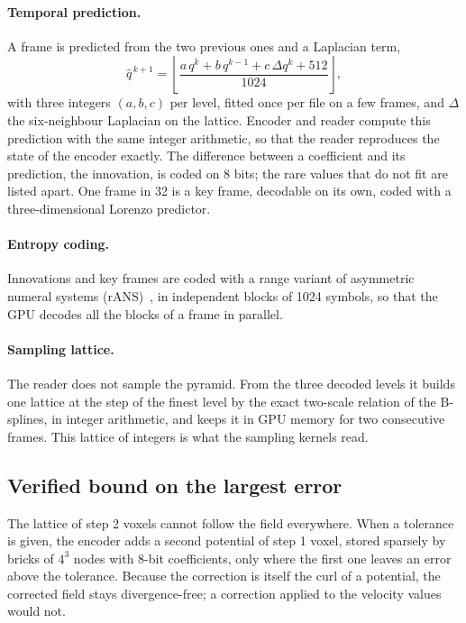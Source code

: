 \documentclass[11pt,a4paper]{article}
\begin{document}
\paragraph{Temporal prediction.}
A frame is predicted from the two previous ones and a Laplacian term,
\begin{equation}
  \hat{q}^{\,k+1} = \left\lfloor \frac{a\,q^{k} + b\,q^{k-1} + c\,\Delta q^{k} + 512}{1024} \right\rfloor ,
\end{equation}
with three integers $(a, b, c)$ per level, fitted once per file on a few frames, and $\Delta$ the six-neighbour
Laplacian on the lattice. Encoder and reader compute this prediction with the same integer arithmetic, so that the
reader reproduces the state of the encoder exactly. The difference between a coefficient and its prediction, the
innovation, is coded on 8 bits; the rare values that do not fit are listed apart. One frame in 32 is a key frame,
decodable on its own, coded with a three-dimensional Lorenzo predictor.

\paragraph{Entropy coding.}
Innovations and key frames are coded with a range variant of asymmetric numeral systems
(rANS)~\cite{duda2013asymmetric}, in independent blocks of 1024 symbols, so that the GPU decodes all the blocks of a
frame in parallel.

\paragraph{Sampling lattice.}
The reader does not sample the pyramid. From the three decoded levels it builds one lattice at the step of the finest
level by the exact two-scale relation of the B-splines, in integer arithmetic, and keeps it in GPU memory for two
consecutive frames. This lattice of integers is what the sampling kernels read.

\subsection{Verified bound on the largest error}

The lattice of step 2 voxels cannot follow the field everywhere. When a tolerance is given, the encoder adds a second
potential of step 1 voxel, stored sparsely by bricks of $4^3$ nodes with 8-bit coefficients, only where the first one
leaves an error above the tolerance. Because the correction is itself the curl of a potential, the corrected field
stays divergence-free; a correction applied to the velocity values would not.
\end{document}
